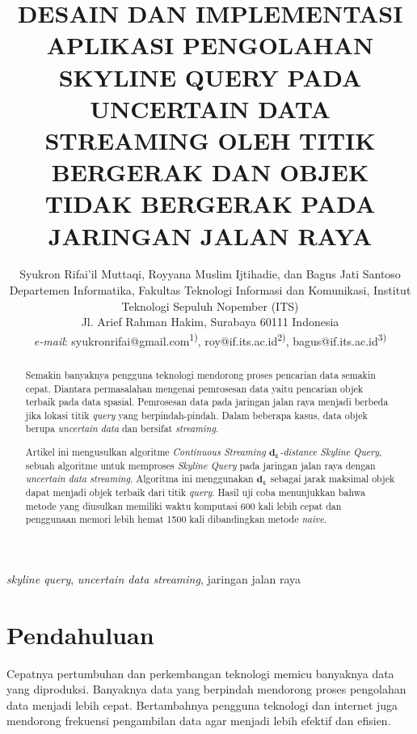 \documentclass[conference]{IEEEtran}
\begin{document}
\title{DESAIN DAN IMPLEMENTASI APLIKASI PENGOLAHAN SKYLINE QUERY PADA UNCERTAIN DATA STREAMING OLEH TITIK BERGERAK DAN OBJEK TIDAK BERGERAK PADA JARINGAN JALAN RAYA}

\author{Syukron Rifai'il Muttaqi, Royyana Muslim Ijtihadie, dan Bagus Jati Santoso\\
Departemen Informatika, Fakultas Teknologi Informasi dan Komunikasi, Institut Teknologi Sepuluh Nopember (ITS)\\
Jl. Arief Rahman Hakim, Surabaya 60111 Indonesia\\
\textit{e-mail}: syukronrifai@gmail.com\textsuperscript{1)}, roy@if.its.ac.id\textsuperscript{2)}, bagus@if.its.ac.id\textsuperscript{3)}
}

\maketitle

\renewcommand\abstractname{\textit{Abstrak}}
\renewcommand\IEEEkeywordsname{Kata kunci}

\begin{abstract}
Semakin banyaknya pengguna teknologi mendorong proses pencarian data semakin cepat. Diantara permasalahan mengenai pemrosesan data yaitu pencarian objek terbaik pada data spasial. Pemrosesan data pada jaringan jalan raya menjadi berbeda jika lokasi titik \textit{query} yang berpindah-pindah. Dalam beberapa kasus, data objek berupa \textit{uncertain data} dan bersifat \textit{streaming}.

Artikel ini mengusulkan algoritme \textit{Continuous Streaming $ \mathbf{d_\varepsilon} $-distance Skyline Query}, sebuah algoritme untuk memproses \textit{Skyline Query} pada jaringan jalan raya dengan \textit{uncertain data streaming}. Algoritma ini menggunakan $ \mathbf{d_\varepsilon} $ sebagai jarak maksimal objek dapat menjadi objek terbaik dari titik \textit{query}. Hasil uji coba menunjukkan bahwa metode yang diusulkan memiliki waktu komputasi 600 kali lebih cepat dan penggunaan memori lebih hemat 1500 kali dibandingkan metode \textit{naive}.
\end{abstract}



\begin{IEEEkeywords}
\textit{skyline query}, \textit{uncertain data streaming}, jaringan jalan raya
\end{IEEEkeywords}

\section{Pendahuluan}
Cepatnya pertumbuhan dan perkembangan teknologi memicu banyaknya data yang diproduksi. Banyaknya data yang berpindah mendorong proses pengolahan data menjadi lebih cepat. Bertambahnya pengguna teknologi dan internet juga mendorong frekuensi pengambilan data agar menjadi lebih efektif dan efisien.
\end{document}
